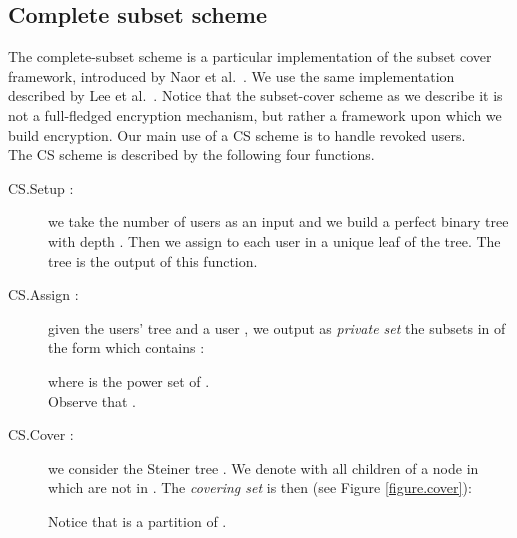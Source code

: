 \documentclass[a4paper,10pt]{article}
\newcommand{\tree}{\mathfrak{T}}
\newcommand{\mapssingleoutput}[2]{}
\newcommand{\algorithmdefsingleoutput}[4]{\item[#1.#2 \mapssingleoutput{#3}{#4}:] }
\newcommand{\CV}{\mathrm{CV}}
\newcommand{\PV}{\mathrm{PV}}
\begin{document}
	\subsection{Complete subset scheme}
	\label{cs.sec}
	The complete-subset scheme is a particular implementation of the subset cover framework, introduced by Naor et al.~\cite{naor2001SC}. We use the same implementation described by Lee et al.~\cite{lee2013RSABE}.
	Notice that the subset-cover scheme as we describe it is not a full-fledged encryption mechanism, but rather a framework upon which we build encryption. Our main use of a CS scheme is to handle revoked users.\\
	The CS scheme is described by the following four functions.
	\begin{description}
	\algorithmdefsingleoutput{CS}{Setup}{N_{\textnormal{max}}}{\tree{}} we take the number of users  as an input and we build a perfect binary tree  with depth .
		Then we assign to each user in  a unique leaf of the tree. The tree  is the output of this function.

		\algorithmdefsingleoutput{CS}{Assign}{\tree{},u}{\PV_{u}} given the users' tree  and a user , we output as \emph{private set} the subsets in  of the form  which contains :
		
		where  is the power set of .\\
		Observe that .


		\algorithmdefsingleoutput{CS}{Cover}{\tree{},R}{\CV_{R}} we consider the Steiner tree . We denote with  all children of a node in  which are not in . The \emph{covering set}  is then (see Figure \ref{figure.cover}):
		
		Notice that   is a partition of .
		

\end{description}
\end{document}
